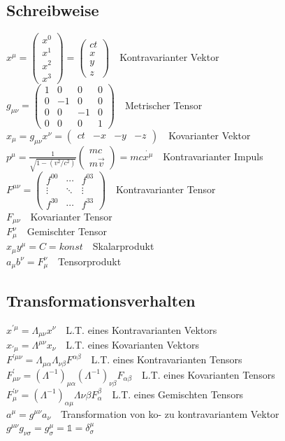 \documentclass[8pt,a4paper]{extarticle}
\newcommand{\frml}[2]{$#1$~\hfill~#2\\}
\begin{document}
\begin{multicols}{3}
\subsection{Schreibweise}
\frml{x^\mu = \begin{pmatrix} x^0 \\ x^1 \\ x^2 \\ x^3 \end{pmatrix} = \begin{pmatrix} ct \\ x \\ y \\ z \end{pmatrix}}{Kontravarianter Vektor}
\frml{g_{\mu \nu} = \begin{pmatrix} 1 & 0 & 0 & 0 \\ 0 & -1 & 0 & 0 \\ 0 & 0 & -1 & 0 \\ 0 & 0 & 0 & 1 \end{pmatrix}}{Metrischer Tensor}
\frml{x_\mu = g_{\mu\nu} x^\nu = \begin{pmatrix} ct & -x & -y & -z \end{pmatrix}}{Kovarianter Vektor}
\frml{p^\mu = \frac{1}{\sqrt{1-(v^2/c^2)}}\begin{pmatrix} mc \\ m\vec{v} \end{pmatrix} = mc\dot{x^\mu}}{Kontravarianter Impuls}
\frml{F^{\mu\nu} = \begin{pmatrix} f^{00} & \cdots & f^{03} \\ \vdots & \ddots & \vdots \\ f^{30} & \cdots & f^{33} \end{pmatrix}}{Kontravarianter Tensor}
\frml{F_{\mu\nu}}{Kovarianter Tensor}
\frml{F_\mu^\nu}{Gemischter Tensor}
\frml{x_\mu y^\mu = C = konst}{Skalarprodukt}
\frml{a_\mu b^\nu = F^\nu_\mu}{Tensorprodukt}

\subsection{Transformationsverhalten}
\frml{x^{'\mu} = \Lambda_{\mu\nu}x^\nu}{L.T. eines Kontravarianten Vektors}
\frml{x_{'\mu} = \Lambda^{\mu\nu}x_\nu}{L.T. eines Kovarianten Vektors}
\frml{F^{'\mu\nu} = \Lambda_{\mu\alpha}\Lambda_{\nu\beta}F^{\alpha\beta}}{L.T. eines Kontravarianten Tensors}
\frml{F^{'}_{\mu\nu} = (\Lambda^{-1})_{\mu\alpha}(\Lambda^{-1})_{\nu\beta}F_{\alpha\beta}}{L.T. eines Kovarianten Tensors}
\frml{F^{'\nu}_\mu = (\Lambda^{-1})_{\alpha\mu}\Lambda{\nu\beta} F_\alpha^\beta}{L.T. eines Gemischten Tensors}
\frml{a^\mu = g^{\mu\nu}a_\nu}{Transformation von ko- zu kontravariantem Vektor}
\frml{g^{\mu\nu}g_{\nu\sigma} = g^\mu_\sigma = \mathbb{1} = \delta_\sigma^\mu}{}


\end{multicols}
\end{document}
